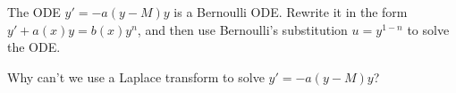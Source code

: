 \begin{problem}
 The ODE $y'=-a(y-M)y$ is a Bernoulli ODE.  Rewrite it in the form $y'+a(x)y=b(x)y^n$, and then use Bernoulli's substitution $u=y^{1-n}$ to solve the ODE.  
\end{problem}
 
\begin{question}
 Why can't we use a Laplace transform to solve $y'=-a(y-M)y$?
\end{question}















